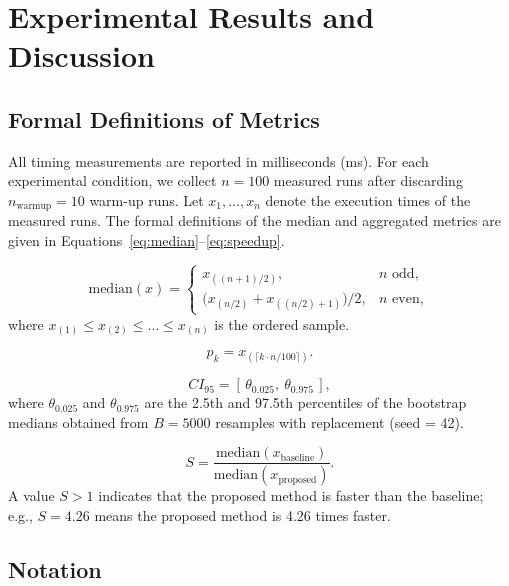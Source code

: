 \section{Experimental Results and Discussion}
\label{sec:results}

\subsection{Formal Definitions of Metrics}
\label{sec:metrics}

All timing measurements are reported in milliseconds (ms). For each experimental condition, we collect $n = 100$ measured runs after discarding $n_{\text{warmup}} = 10$ warm-up runs. Let $x_1, \dots, x_n$ denote the execution times of the measured runs. The formal definitions of the median and aggregated metrics are given in Equations~\eqref{eq:median}--\eqref{eq:speedup}.

\begin{equation}
\label{eq:median}
\mathrm{median}(x) =
\begin{cases}
x_{((n+1)/2)}, & n \text{ odd}, \\[4pt]
\bigl(x_{(n/2)} + x_{((n/2)+1)}\bigr)/2, & n \text{ even},
\end{cases}
\end{equation}
where $x_{(1)} \le x_{(2)} \le \dots \le x_{(n)}$ is the ordered sample.

\begin{equation}
\label{eq:percentile}
p_k = x_{(\lceil k \cdot n / 100 \rceil)}.
\end{equation}

\begin{equation}
\label{eq:ci}
CI_{95} = [\,\theta_{0.025},\ \theta_{0.975}\,],
\end{equation}
where $\theta_{0.025}$ and $\theta_{0.975}$ are the 2.5th and 97.5th percentiles of the bootstrap medians obtained from $B = 5000$ resamples with replacement (seed = 42).

\begin{equation}
\label{eq:speedup}
S = \frac{\mathrm{median}(x_{\text{baseline}})}{\mathrm{median}(x_{\text{proposed}})}.
\end{equation}
A value $S > 1$ indicates that the proposed method is faster than the baseline; e.g., $S = 4.26$ means the proposed method is 4.26 times faster.

\subsection{Notation}
\label{sec:notation}


